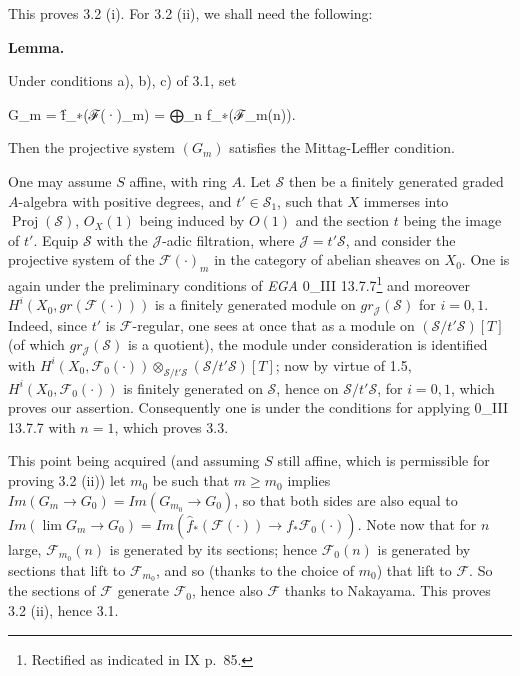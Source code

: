 \documentclass[
]{article}
\newenvironment{Shaded}{}{}
\newcommand{\NormalTok}[1]{#1}
\begin{document}
This proves 3.2 (i). For 3.2 (ii), we shall need the following:

\textbf{Lemma.}

Under conditions a), b), c) of 3.1, set

\begin{Shaded}
\begin{Highlighting}[]
\NormalTok{G\_m = f̂\_∗(ℱ(·)\_m) = ⨁\_n f\_∗(ℱ\_m(n)).}
\end{Highlighting}
\end{Shaded}

Then the projective system \((G_{m})\) satisfies the Mittag-Leffler
condition.

One may assume \(S\) affine, with ring \(A\). Let \(\mathcal{S}\) then
be a finitely generated graded \(A\)-algebra with positive degrees, and
\(t' \in \mathcal{S}_{1}\), such that \(X\) immerses into
\(\operatorname{Proj}(\mathcal{S})\), \(O_{X}(1)\) being induced by
\(O(1)\) and the section \(t\) being the image of \(t'\). Equip
\(\mathcal{S}\) with the \(\mathcal{J}\)-adic filtration, where
\(\mathcal{J} = t'\mathcal{S}\), and consider the projective system of
the \(\mathcal{F}(\cdot)_{m}\) in the category of abelian sheaves on
\(X_{0}\). One is again under the preliminary conditions of \emph{EGA}
0\_III 13.7.7\footnote{Rectified as indicated in IX p.~85.} and moreover
\(H^{i}(X_{0}, gr(\mathcal{F}(\cdot)))\) is a finitely generated module
on \(gr_{\mathcal{J}}(\mathcal{S})\) for \(i = 0, 1\). Indeed, since
\(t'\) is \(\mathcal{F}\)-regular, one sees at once that as a module on
\((\mathcal{S}/t'\mathcal{S})[T]\) (of which
\(gr_{\mathcal{J}}(\mathcal{S})\) is a quotient), the module under
consideration is identified with
\(H^{i}(X_{0}, \mathcal{F}_{0}(\cdot)) \otimes_{\mathcal{S}/t'\mathcal{S}} (\mathcal{S}/t'\mathcal{S})[T]\);
now by virtue of 1.5, \(H^{i}(X_{0}, \mathcal{F}_{0}(\cdot))\) is
finitely generated on \(\mathcal{S}\), hence on
\(\mathcal{S}/t'\mathcal{S}\), for \(i = 0, 1\), which proves our
assertion. Consequently one is under the conditions for applying 0\_III
13.7.7 with \(n = 1\), which proves 3.3.

This point being acquired (and assuming \(S\) still affine, which is
permissible for proving 3.2 (ii)) let \(m_{0}\) be such that
\(m \geqslant m_{0}\) implies
\(Im(G_{m} \to G_{0}) = Im(G_{m_{0}} \to G_{0})\), so that both sides
are also equal to
\(Im(\lim G_{m} \to G_{0}) = Im(\hat{f}_{\ast}(\mathcal{F}(\cdot)) \to f_{\ast }\mathcal{F}_{0}(\cdot))\).
Note now that for \(n\) large, \(\mathcal{F}_{m_{0}}(n)\) is generated
by its sections; hence \(\mathcal{F}_{0}(n)\) is generated by sections
that lift to \(\mathcal{F}_{m_{0}}\), and so (thanks to the choice of
\(m_{0}\)) that lift to \(\mathcal{F}\). So the sections of
\(\mathcal{F}\) generate \(\mathcal{F}_{0}\), hence also \(\mathcal{F}\)
thanks to Nakayama. This proves 3.2 (ii), hence 3.1.
\end{document}
